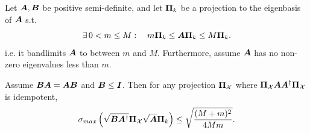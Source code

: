 \begin{lemma}
\label{lemma:bandlimited_kantorovich}
Let $\bm{A}, \bm{B}$ be positive semi-definite, and let $\projgen{k}$ be a projection to the eigenbasis of $\bm{A}$ s.t.
\begin{equation}
    \exists\, 0<m\leq M: \quad m\projgen{k} \leq \matr{A}\projgen{k} \leq M\projgen{k}.
\end{equation}
 i.e. it bandlimits $\bm{A}$ to between $m$ and $M$. Furthermore, assume $\bm{A}$ has no {non-zero} eigenvalues less than $m$.
    
    Assume $\bm{B}\bm{A} = \bm{A}\bm{B}$ and $ \bm{B} \leq \bm{I}$. Then for any projection $\proj{X}$ where $\proj{X}\matr{A}\matr{A}^{\dagger}\proj{X}$ is idempotent,
    \begin{equation}
\sigma_{max}\left(\sqrt{\matr{B}\matr{A}^{\dagger}}\proj{X}\sqrt{\matr{A}} \projgen{k} \right) \leq \sqrt{\frac{(M + m)^{2}}{4Mm}}.
    \end{equation}
\end{lemma}
